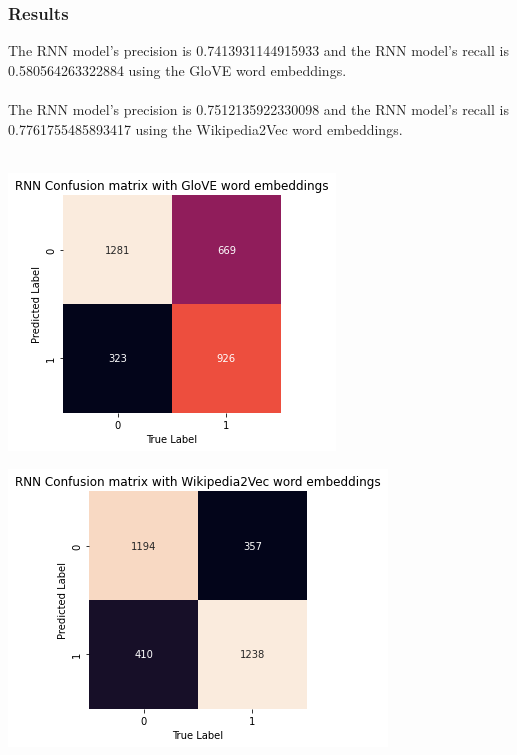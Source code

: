 \documentclass[12pt]{article}
\begin{document}
\subsubsection{Results}
The RNN model's precision is 0.7413931144915933 and the RNN model's recall is 0.580564263322884 using the GloVE word embeddings.\\
\\
The RNN model's precision is 0.7512135922330098 and the RNN model's recall is 0.7761755485893417 using the Wikipedia2Vec word embeddings.\\
\\
\begin{center}
\includegraphics[scale=1]{glove-mat.png}
\end{center}

\begin{center}
\includegraphics[scale=1]{wiki-mat.png}
\end{center}
\end{document}
